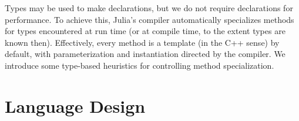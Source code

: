 \documentclass[9pt]{sigplanconf}
\begin{document}
Types may be used to make declarations, but we do not
require declarations for performance. To achieve this, Julia's compiler
automatically specializes methods for types encountered at run time
(or at compile time, to the extent types are known then). Effectively,
every method is a template (in the C++ sense) by default, with
parameterization and instantiation directed by the compiler.
We introduce some type-based heuristics for controlling method specialization.






\section{Language Design}
\end{document}
